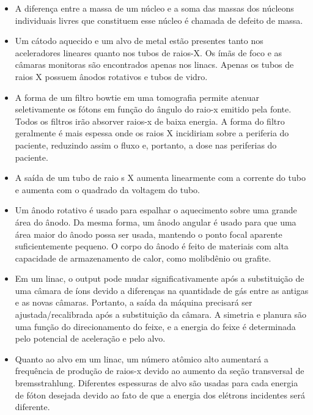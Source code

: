 \documentclass[11pt,a4paper]{article}
\newcounter{exemplo}
\begin{document}
\begin{exemplo}[Física]
\begin{itemize}
        \item A diferença entre a massa de um núcleo e a soma das massas dos núcleons individuais livres que constituem esse núcleo é chamada de defeito de massa.
        
        \item Um cátodo aquecido e um alvo de metal estão presentes tanto nos aceleradores lineares quanto nos tubos de raios-X. Os ímãs de foco e as câmaras monitoras são encontrados apenas nos linacs. Apenas os tubos de raios X possuem ânodos rotativos e tubos de vidro.
        
        \item A forma de um filtro bowtie em uma tomografia permite atenuar seletivamente os fótons em função do ângulo do raio-x emitido pela fonte. Todos os filtros irão absorver raios-x de baixa energia. A forma do filtro geralmente é mais espessa onde os raios X incidiriam sobre a periferia do paciente, reduzindo assim o fluxo e, portanto, a dose nas periferias do paciente.
        
        \item A saída de um tubo de raio    s X aumenta linearmente com a corrente do tubo e aumenta com o quadrado da voltagem do tubo.
        
        \item Um ânodo rotativo é usado para espalhar o aquecimento sobre uma grande área do ânodo. Da mesma forma, um ânodo angular é usado para que uma área maior do ânodo possa ser usada, mantendo o ponto focal aparente suficientemente pequeno. O corpo do ânodo é feito de materiais com alta capacidade de armazenamento de calor, como molibdênio ou grafite.
        
        \item Em um linac, o output pode mudar significativamente após a substituição de uma câmara de íons devido a diferenças na quantidade de gás entre as antigas e as novas câmaras. Portanto, a saída da máquina precisará ser ajustada/recalibrada após a substituição da câmara. A simetria e planura são uma função do direcionamento do feixe, e a energia do feixe é determinada pelo potencial de aceleração e pelo alvo.
        
        \item Quanto ao alvo em um linac, um número atômico alto aumentará a frequência de produção de raios-x devido ao aumento da seção transversal de bremsstrahlung. Diferentes espessuras de alvo são usadas para cada energia de fóton desejada devido ao fato de que a energia dos elétrons incidentes será diferente.
        

\end{itemize}
\end{exemplo}
\end{document}
